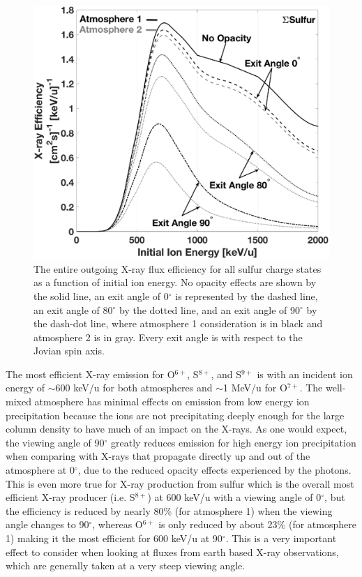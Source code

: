 \documentclass[draft]{agujournal2018}
\begin{document}
\begin{figure}[ht]
    \centering
    \includegraphics[width=\textwidth]{Figures/SulXrayEff.eps}
    \caption{The entire outgoing X-ray flux efficiency for all sulfur charge states as a function of initial ion energy. No opacity effects are shown by the solid line, an exit angle of 0$^{\circ}$ is represented by the dashed line, an exit angle of 80$^{\circ}$ by the dotted line, and an exit angle of 90$^{\circ}$ by the dash-dot line, where atmosphere 1 consideration is in black and atmosphere 2 is in gray. Every exit angle is with respect to the Jovian spin axis.}
    \label{fig:SulXrayEff}
\end{figure}

The most efficient X-ray emission for O$^{6+}$, S$^{8+}$, and S$^{9+}$ is with an incident ion energy of $\sim$600 keV/u for both atmospheres and $\sim$1 MeV/u for O$^{7+}$.
The well-mixed atmosphere has minimal effects on emission from low energy ion precipitation because the ions are not precipitating deeply enough for the large column density to have much of an impact on the X-rays.
As one would expect, the viewing angle of 90$^{\circ}$ greatly reduces emission for high energy ion precipitation when comparing with X-rays that propagate directly up and out of the atmosphere at 0$^{\circ}$, due to the reduced opacity effects experienced by the photons.
This is even more true for X-ray production from sulfur which is the overall most efficient X-ray producer (i.e. S$^{8+}$) at 600 keV/u with a viewing angle of 0$^{\circ}$, but the efficiency is reduced by nearly 80$\%$ (for atmosphere 1) when the viewing angle changes to 90$^{\circ}$, whereas O$^{6+}$ is only reduced by about 23$\%$ (for atmosphere 1) making it the most efficient for 600 keV/u at 90$^{\circ}$.
This is a very important effect to consider when looking at fluxes from earth based X-ray observations, which are generally taken at a very steep viewing angle.
\end{document}
